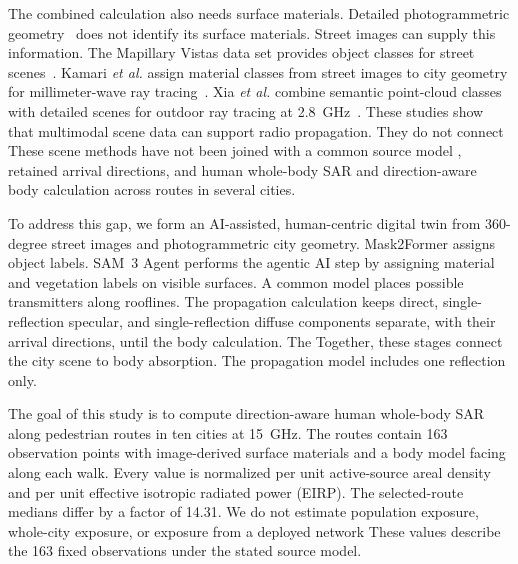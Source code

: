 \documentclass{IEEEoj}
\providecommand{\DIFadd}[1]{{\protect\color{blue} \sf #1}} %
\providecommand{\DIFdel}[1]{{\protect\color{red} \scriptsize #1}} %
\providecommand{\DIFaddbegin}{} %
\providecommand{\DIFaddend}{} %
\providecommand{\DIFdelbegin}{} %
\providecommand{\DIFdelend}{} %
\begin{document}
\DIFaddbegin \DIFadd{The combined calculation also needs surface materials. }\DIFaddend Detailed
photogrammetric geometry~\cite{google3d,blosm} does not identify its
surface materials. Street images can supply this information. The Mapillary
Vistas data set provides object classes for street scenes~\cite{vistas}.
Kamari \emph{et al.} assign material classes from street images to city geometry
for millimeter-wave ray tracing~\cite{mmsv}. Xia \emph{et al.} combine semantic
point-cloud classes with detailed scenes for outdoor ray tracing at
2.8~GHz~\cite{xia2024}. These studies show that multimodal scene data can
support radio propagation. \DIFdelbegin \DIFdel{They do not connect }\DIFdelend \DIFaddbegin \DIFadd{These scene methods have not been joined with }\DIFaddend a
common source model \DIFdelbegin \DIFdel{, retained
arrival directions, and human whole-body SAR }\DIFdelend \DIFaddbegin \DIFadd{and direction-aware body calculation }\DIFaddend across routes in
several cities.

To address this gap, we form an AI-assisted, human-centric digital twin from
360-degree street images and photogrammetric city geometry. Mask2Former assigns
object labels. SAM~3 Agent performs the agentic AI step by assigning material
and vegetation labels on visible surfaces. A common model
places possible transmitters along rooflines. The propagation calculation keeps
direct, single-reflection specular, and single-reflection diffuse components
separate, with their arrival directions, until the body calculation. \DIFdelbegin \DIFdel{The }\DIFdelend \DIFaddbegin \DIFadd{Together,
these stages connect the city scene to body absorption. The propagation }\DIFaddend model
includes one reflection\DIFdelbegin \DIFdel{only}\DIFdelend .

The goal of this study is to compute direction-aware human whole-body SAR along
pedestrian routes in ten cities at 15~GHz. The routes contain 163 observation
points with image-derived surface materials and a body model facing along each
walk. Every value is normalized per unit active-source areal density and per
unit effective isotropic radiated power (EIRP). The selected-route medians
differ by a factor of 14.31. \DIFdelbegin \DIFdel{We do not estimate population exposure,
whole-city exposure, or exposure from a deployed network}\DIFdelend \DIFaddbegin \DIFadd{These values describe the 163 fixed observations
under the stated source model}\DIFaddend .
\end{document}
